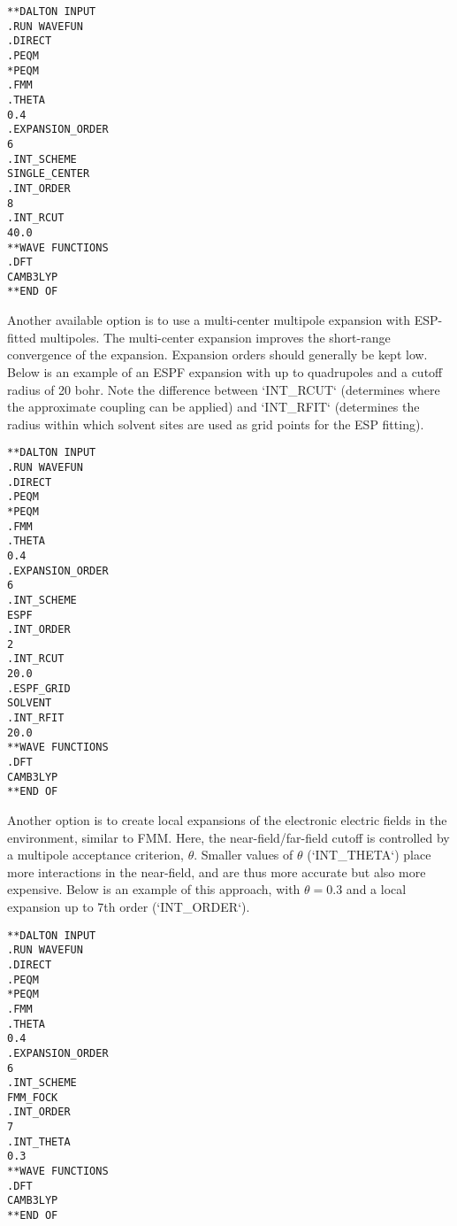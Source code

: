 \begin{verbatim}
**DALTON INPUT
.RUN WAVEFUN
.DIRECT
.PEQM
*PEQM
.FMM
.THETA
0.4
.EXPANSION_ORDER
6
.INT_SCHEME
SINGLE_CENTER
.INT_ORDER
8
.INT_RCUT
40.0
**WAVE FUNCTIONS
.DFT
CAMB3LYP
**END OF
\end{verbatim}

Another available option is to use a multi-center multipole expansion with ESP-fitted multipoles.
The multi-center expansion improves the short-range convergence of the expansion.
Expansion orders should generally be kept low.
Below is an example of an ESPF expansion with up to quadrupoles and a cutoff radius of 20 bohr.
Note the difference between `INT\_RCUT` (determines where the approximate coupling can be applied) and `INT\_RFIT` (determines the radius within which solvent sites are used as grid points for the ESP fitting).

\begin{verbatim}
**DALTON INPUT
.RUN WAVEFUN
.DIRECT
.PEQM
*PEQM
.FMM
.THETA
0.4
.EXPANSION_ORDER
6
.INT_SCHEME
ESPF
.INT_ORDER
2
.INT_RCUT
20.0
.ESPF_GRID
SOLVENT
.INT_RFIT
20.0
**WAVE FUNCTIONS
.DFT
CAMB3LYP
**END OF
\end{verbatim}

Another option is to create local expansions of the electronic electric fields in the environment, similar to FMM.
Here, the near-field/far-field cutoff is controlled by a multipole acceptance criterion, $\theta$.
Smaller values of $\theta$ (`INT\_THETA`) place more interactions in the near-field, and are thus more accurate but also more expensive.
Below is an example of this approach, with $\theta=0.3$ and a local expansion up to 7th order (`INT\_ORDER`).

\begin{verbatim}
**DALTON INPUT
.RUN WAVEFUN
.DIRECT
.PEQM
*PEQM
.FMM
.THETA
0.4
.EXPANSION_ORDER
6
.INT_SCHEME
FMM_FOCK
.INT_ORDER
7
.INT_THETA
0.3
**WAVE FUNCTIONS
.DFT
CAMB3LYP
**END OF
\end{verbatim}
